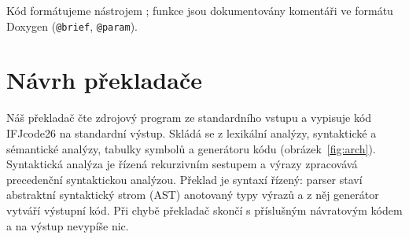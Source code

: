 \documentclass[11pt]{article}
\newif\ifdraft
\newcommand{\todo}[1]{\ifdraft{\color{red}\textbf{[TODO: #1]}}\fi}
\begin{document}
Kód formátujeme nástrojem \todo{např.\ clang-format, konfigurace}; funkce jsou dokumentovány komentáři ve formátu Doxygen (\texttt{@brief}, \texttt{@param}).

\section{Návrh překladače}
Náš překladač čte zdrojový program ze standardního vstupu a vypisuje kód IFJcode26 na standardní výstup. Skládá se z lexikální analýzy, syntaktické a sémantické analýzy, tabulky symbolů a generátoru kódu (obrázek~\ref{fig:arch}). Syntaktická analýza je řízená rekurzivním sestupem a výrazy zpracovává precedenční syntaktickou analýzou. Překlad je syntaxí řízený: parser staví abstraktní syntaktický strom (AST) anotovaný typy výrazů a z něj generátor vytváří výstupní kód. Při chybě překladač skončí s příslušným návratovým kódem a na výstup nevypíše nic.
\end{document}
